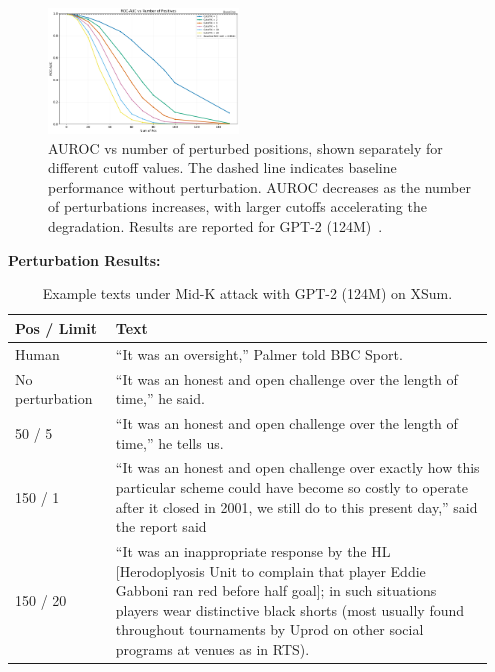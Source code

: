 \documentclass[11pt]{article}
\begin{document}
\begin{figure}[H]
    \centering
    \includegraphics[width=0.45\textwidth]{graphs/attack/roc_vs_pos_by_k.pdf} %
    \caption{AUROC vs number of perturbed positions, shown separately for different cutoff values. The dashed line indicates baseline performance without perturbation. AUROC decreases as the number of perturbations increases, with larger cutoffs accelerating the degradation. Results are reported for GPT-2 (124M)~\cite{radford2019language}.}
    \label{fig:ROC_attack}
\end{figure}

\begin{table}[H]
    \caption{Example texts under Mid-K attack with GPT-2 (124M) on XSum.}
    \label{tab:placeholder}
\vspace{1em}
\noindent
\textbf{Perturbation Results:}
\\
\begin{tabular}{|p{0.2\linewidth}|p{0.75\linewidth}|}
    \hline
    \textbf{Pos / Limit} & \textbf{Text} \\
    \hline
    Human & ``It was an oversight,'' Palmer told BBC Sport.\\
    \hline
    No perturbation & ``It was an honest and open challenge over the length of time,'' he said. \\
    \hline
    50 / 5 & ``It was an honest and open challenge over the length of time,'' he tells us.\\
    \hline
    150 / 1 & ``It was an honest and open challenge over exactly how this particular scheme could have become so costly to operate after it closed in 2001, we still do to this present day,'' said the report said\\
    \hline
    150 / 20 & ``It was an inappropriate response by the HL [Herodoplyosis Unit to complain that player Eddie Gabboni ran red before half goal]; in such situations players wear distinctive black shorts (most usually found throughout tournaments by Uprod on other social programs at venues as in RTS).\\
    \hline
\end{tabular}
\end{table}
\end{document}
